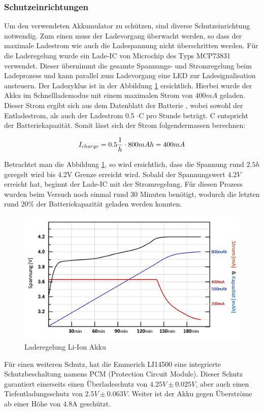 \subsubsection*{Schutzeinrichtungen}\label{sec:schutzeinrichtung}
Um den verwendeten Akkumulator zu schützen, sind diverse Schutzeinrichtung notwendig. Zum einen muss der Ladevorgang überwacht werden, so dass der maximale Ladestrom wie auch die Ladespannung nicht überschritten werden. Für die Laderegelung wurde ein Lade-IC von Microchip des Typs MCP73831 verwendet. Dieser übernimmt die gesamte Spannungs- und Stromregelung beim Ladeprozess und kann parallel zum Ladevorgang eine LED zur Ladesignalisation ansteuern. Der Ladezyklus ist in der Abbildung  \ref{fig:Ladekurve Li-Ion Akku} ersichtlich. Hierbei wurde der Akku im Schnelllademodus mit einem maximalen Strom von $400mA$ geladen. Dieser Strom ergibt sich aus dem Datenblatt der Batterie \cite{LIBattery}, wobei sowohl der Entladestrom, als auch der Ladestrom 0.5 $\cdot$C pro Stunde beträgt. C entspricht der Batteriekapazität. Somit lässt sich der Strom folgendermassen berechnen:

\begin{equation}
\centering
I_{charge}={0.5 \dfrac{1}{h} \cdot 800mAh}= 400mA
\label{eq:Ladestrom}
\end{equation}

Betrachtet man die Abbildung \ref{fig:Ladekurve Li-Ion Akku}, so wird ersichtlich, dass die Spannung rund $2.5h$ geregelt wird bis 4.2V Grenze erreicht wird. Sobald der Spannungswert $4.2V$ erreicht hat, beginnt der Lade-IC mit der Stromregelung. Für diesen Prozess wurden beim Versuch noch einmal rund 30 Minuten benötigt, wodurch die letzten rund $20\%$ der Batteriekapazität geladen werden konnten.

\begin{figure}[H]
	\begin{center}
		\includegraphics[width=120mm]{data/LadekurveLiIon.png}
		\caption[Laderegelung Li-Ion Akku]{Laderegelung Li-Ion Akku} %
		\label{fig:Ladekurve Li-Ion Akku}
	\end{center}
\end{figure}


Für einen weiteren Schutz, hat die Emmerich LI14500 eine integrierte Schutzbeschaltung namens PCM (Protection Circuit Module). Dieser Schutz garantiert einerseits einen Überladeschutz von $4.25V\pm 0.025V$, aber auch einen Tiefentladungsschutz von $2.5V\pm 0.063V$. Weiter ist der Akku gegen Überströme ab einer Höhe von 4.8A geschützt.